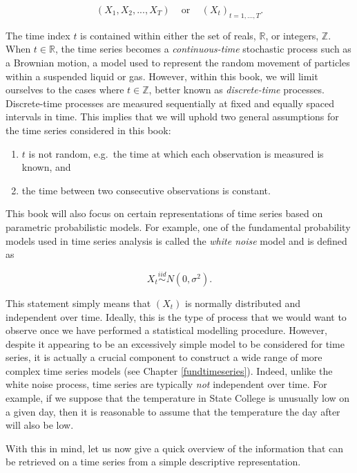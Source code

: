 \documentclass[]{book}
\providecommand{\tightlist}{%
  \setlength{\itemsep}{0pt}\setlength{\parskip}{0pt}}
\theoremstyle{definition}
\theoremstyle{definition}
\theoremstyle{definition}
\theoremstyle{remark}
\begin{document}
\[\left(X_1, X_2, ..., X_T \right) \;\;\; \text{ or } \;\;\; \left(X_t\right)_{t = 1,...,T}.\]

The time index \(t\) is contained within either the set of reals,
\(\mathbb{R}\), or integers, \(\mathbb{Z}\). When \(t \in \mathbb{R}\),
the time series becomes a \emph{continuous-time} stochastic process such
as a Brownian motion, a model used to represent the random movement of
particles within a suspended liquid or gas. However, within this book,
we will limit ourselves to the cases where \(t \in \mathbb{Z}\), better
known as \emph{discrete-time} processes. Discrete-time processes are
measured sequentially at fixed and equally spaced intervals in time.
This implies that we will uphold two general assumptions for the time
series considered in this book:

\begin{enumerate}
\def\labelenumi{\arabic{enumi}.}
\tightlist
\item
  \(t\) is not random, e.g.~the time at which each observation is
  measured is known, and
\item
  the time between two consecutive observations is constant.
\end{enumerate}

This book will also focus on certain representations of time series
based on parametric probabilistic models. For example, one of the
fundamental probability models used in time series analysis is called
the \emph{white noise} model and is defined as

\[X_t \mathop \sim \limits^{iid} N(0, \sigma^2).\]

This statement simply means that \((X_t)\) is normally distributed and
independent over time. Ideally, this is the type of process that we
would want to observe once we have performed a statistical modelling
procedure. However, despite it appearing to be an excessively simple
model to be considered for time series, it is actually a crucial
component to construct a wide range of more complex time series models
(see Chapter \ref{fundtimeseries}). Indeed, unlike the white noise
process, time series are typically \emph{not} independent over time. For
example, if we suppose that the temperature in State College is
unusually low on a given day, then it is reasonable to assume that the
temperature the day after will also be low.

With this in mind, let us now give a quick overview of the information
that can be retrieved on a time series from a simple descriptive
representation.
\end{document}
